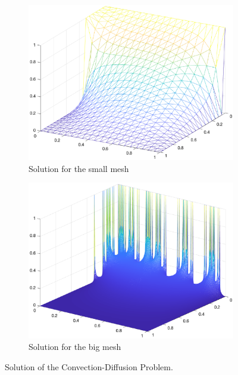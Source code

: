 \documentclass{article}
\begin{document}
\begin{figure}[H]
	\begin{minipage}[b]{0.5\linewidth}
		\centering
		\begin{subfigure}{\linewidth}
			\centering
			\includegraphics[width=0.7\linewidth]{small_solution_right}
			\caption{Solution for the small mesh}

		\end{subfigure}
			\label{fig:bigmeshnobound}
	\end{minipage}%
	\begin{minipage}[b]{0.5\linewidth}
		\centering
		\begin{subfigure}{\linewidth}
			\centering
			\includegraphics[width=0.7\linewidth]{bigmesh_nobound}

			\caption{Solution for the big mesh}
		\end{subfigure}
			\label{fig:smallsolutionright}
	\end{minipage}
	\caption{Solution of the Convection-Diffusion Problem.}
	\label{fig:solution}
\end{figure}



\end{document}
